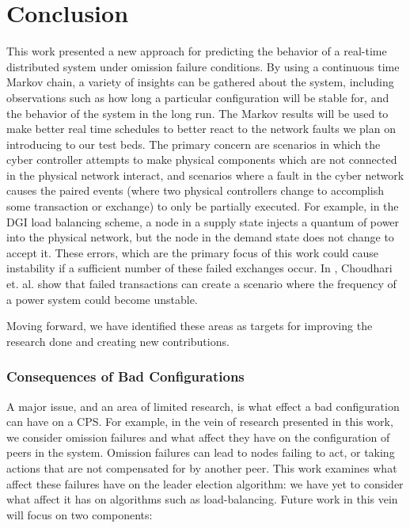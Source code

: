 \chapter{Conclusion}

This work presented a new approach for predicting the behavior of a real-time distributed system under omission failure conditions. By using a continuous time Markov chain, a variety of insights can be gathered about the system, including observations such as how long a particular configuration will be stable for, and the behavior of the system in the long run.  The Markov results will be used  to make better real time schedules to better react to the network faults we plan on introducing to our test beds. The primary concern are scenarios in which the cyber controller attempts to make physical components which are not connected in the physical network interact, and scenarios where a fault in the cyber network causes the paired events (where two physical controllers change to accomplish some transaction or exchange) to only be partially executed. For example, in the DGI load balancing scheme, a node in a supply state injects a quantum of power into the physical network, but the node in the demand state does not change to accept it. These errors, which are the primary focus of this work could cause instability if a sufficient number of these failed exchanges occur. In \cite{HARINI}, Choudhari et. al. show that failed transactions can create a scenario where the frequency of a power system could become unstable. 

Moving forward, we have identified these areas as targets for improving the research done and creating new contributions.

\subsection{Consequences of Bad Configurations}

A major issue, and an area of limited research, is what effect a bad configuration can have on a CPS. For example, in the vein of research presented in this work, we consider omission failures and what affect they have on the configuration of peers in the system. Omission failures can lead to nodes failing to act, or taking actions that are not compensated for by another peer. This work examines what affect these failures have on the leader election algorithm: we have yet to consider what affect it has on algorithms such as load-balancing. Future work in this vein will focus on two components:

